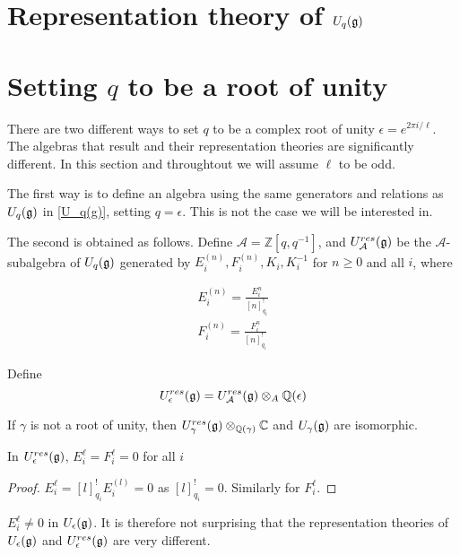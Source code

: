 \section{Representation theory of $U_q(\mathfrak{g})$}

\section{Setting $q$ to be a root of unity}

There are two different ways to set $q$ to be a complex root of unity $\epsilon
= e^{2\pi i/\ell}$. The algebras that result and their representation theories
are significantly different. In this section and throughtout we will assume
$\ell$ to be odd. 

The first way is to define an algebra using the same generators and relations
as $U_q(\mathfrak{g})$ in \ref{U_q(g)}, setting $q = \epsilon$. This is not the
case we will be interested in.

The second is obtained as follows. Define $\mathcal{A} = \mathbb{Z}[q,
q^{-1}]$, and $U_\mathcal{A}^{res}(\mathfrak{g})$ be the
$\mathcal{A}$-subalgebra of $U_q(\mathfrak{g})$ generated by $E_i^{(n)},
F_i^{(n)}, K_i, K_i^{-1}$ for $n \geq 0$ and all $i$, where

\begin{align}
    E_i^{(n)} = \frac{E_i^n}{[n]^!_{q_i}} \\
    F_i^{(n)} = \frac{F_i^n}{[n]^!_{q_i}} 
\end{align}


Define 
\begin{equation}
    U_\epsilon^{res}(\mathfrak{g}) = U_\mathcal{A}^{res}(\mathfrak{g}) \otimes_A \mathbb{Q}(\epsilon)
\end{equation}

If $\gamma$ is not a root of unity, then $U_\gamma^{res}(\mathfrak{g})
\otimes_{\mathbb{Q}(\gamma)} \mathbb{C}$ and $U_\gamma(\mathfrak{g})$ are
isomorphic.

\begin{lemma}
    In $U_\epsilon^{res}(\mathfrak{g})$, $E_i^\ell = F_i^\ell = 0$ for all $i$
\end{lemma}
\begin{proof}
    $E_i^\ell = [l]_{q_i}^! E_i^{(l)} = 0$ as $[l]_{q_i}^! = 0$. Similarly for $F_i^\ell$.
\end{proof}

$E_i^\ell \neq 0$ in $U_\epsilon(\mathfrak{g})$. It is therefore not surprising that
the representation theories of $U_\epsilon(\mathfrak{g})$ and
$U_\epsilon^{res}(\mathfrak{g})$ are very different.


